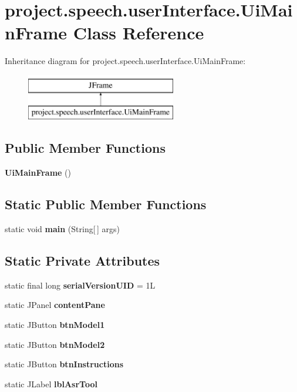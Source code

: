 \section{project.\+speech.\+user\+Interface.\+Ui\+Main\+Frame Class Reference}
\label{classproject_1_1speech_1_1user_interface_1_1_ui_main_frame}
Inheritance diagram for project.\+speech.\+user\+Interface.\+Ui\+Main\+Frame\+:\begin{figure}[H]
\begin{center}
\leavevmode
\includegraphics[height=2.000000cm]{classproject_1_1speech_1_1user_interface_1_1_ui_main_frame}
\end{center}
\end{figure}
\subsection*{Public Member Functions}
\begin{DoxyCompactItemize}
\item 
{\bf Ui\+Main\+Frame} ()
\end{DoxyCompactItemize}
\subsection*{Static Public Member Functions}
\begin{DoxyCompactItemize}
\item 
static void {\bf main} (String[$\,$] args)
\end{DoxyCompactItemize}
\subsection*{Static Private Attributes}
\begin{DoxyCompactItemize}
\item 
static final long {\bf serial\+Version\+U\+I\+D} = 1\+L
\item 
static J\+Panel {\bf content\+Pane}
\item 
static J\+Button {\bf btn\+Model1}
\item 
static J\+Button {\bf btn\+Model2}
\item 
static J\+Button {\bf btn\+Instructions}
\item 
static J\+Label {\bf lbl\+Asr\+Tool}
\end{DoxyCompactItemize}


